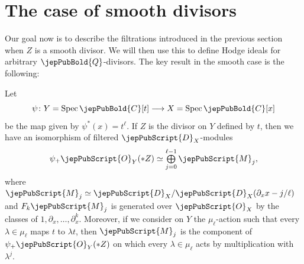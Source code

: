 \section{The case of smooth divisors}\label{smooth}


Our goal now is to describe the filtrations introduced in the previous section when $Z$ is a smooth divisor. We will then use this to define
Hodge ideals for arbitrary $\jepPubBold{Q}$-divisors. The key result in the smooth case is the following:

\begin{lemma}\label{lem_decomp2}
Let 
 $$\psi\colon Y=\operatorname{Spec} \jepPubBold{C}[t]\longrightarrow X=\operatorname{Spec} \jepPubBold{C}[x]$$ be
  the map given by $\psi^*(x)=t^{\ell}$. If $Z$ is the divisor on $Y$ defined by
$t$, then
we have
an isomorphism of filtered $\jepPubScript{D}_X$-modules
$$\psi_+\jepPubScript{O}_{Y}(*Z)\simeq\mathop{\textstyle\bigoplus}\limits_{j=0}^{\ell-1}\jepPubScript{M}_j,$$
where 
$\jepPubScript{M}_j\simeq\jepPubScript{D}_X/\jepPubScript{D}_X(\partial_x x - j/\ell)$ 
and $F_k\jepPubScript{M}_j$ is generated over $\jepPubScript{O}_X$ by the classes of $1,\partial_x,\ldots,\partial_x^k$.
Moreover, if we consider on $Y$ the $\mu_{\ell}$-action such that every $\lambda\in\mu_{\ell}$ maps $t$ to $\lambda t$, then
$\jepPubScript{M}_j$ is
the component of $\psi_+\jepPubScript{O}_{Y}(*Z)$
on which every  $\lambda\in\mu_{\ell}$ acts by multiplication with $\lambda^j$.
\end{lemma}


